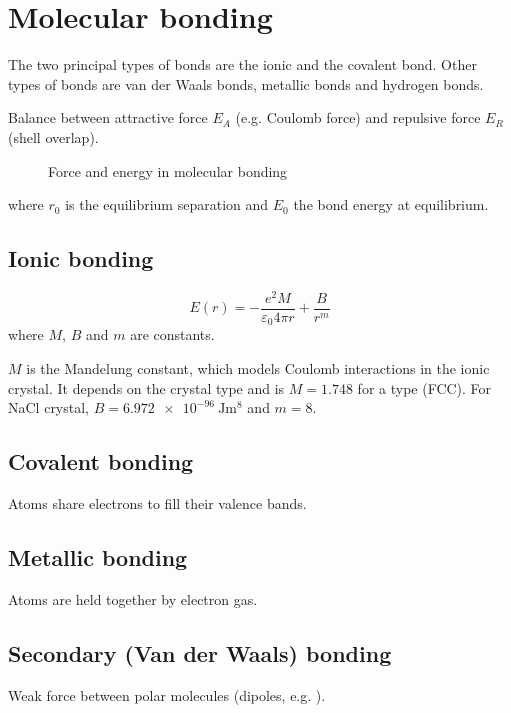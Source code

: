 \section{Molecular bonding}
The two principal types of bonds are the ionic and the covalent bond. 
Other types of bonds are van der Waals bonds, metallic bonds and hydrogen bonds.

Balance between attractive force $E_A$ (e.g. Coulomb force) and repulsive force $E_R$ (shell overlap).

\begin{figure}[ht]
    \centering
    
    \caption{Force and energy in molecular bonding}
\end{figure}

where $r_0$ is the equilibrium separation and $E_0$ the bond energy at equilibrium.

\subsection{Ionic bonding}

\begin{equation}
	E(r) = -\frac{e^2 M}{\varepsilon_0 4 \pi r} + \frac{B}{r^m}
\end{equation}
where $M$, $B$ and $m$ are constants. 

$M$ is the Mandelung constant, which models Coulomb interactions in the ionic crystal.
It depends on the crystal type and is $M=1.748$ for a  type (FCC).
For NaCl crystal, $B=\SI{6.972e-96}{\joule\meter\tothe{8}}$ and $m=8$.

\subsection{Covalent bonding} 
Atoms share electrons to fill their valence bands.

\subsection{Metallic bonding}
Atoms are held together by electron gas.

\subsection{Secondary (Van der Waals) bonding}
Weak force between polar molecules (dipoles, e.g. ). 


